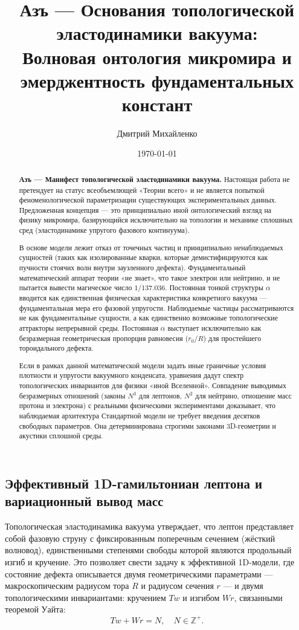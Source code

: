 \documentclass[11pt,a4paper]{article}
\title{\textbf{Азъ — Основания топологической\\ эластодинамики вакуума:\\ Волновая онтология микромира и эмерджентность фундаментальных констант}}
\author{Дмитрий Михайленко}
\date{\today}
\begin{document}
	
	\maketitle
	
	\begin{abstract}
		\textbf{Азъ — Манифест топологической эластодинамики вакуума.} 
		Настоящая работа не претендует на статус всеобъемлющей «Теории всего» и не является попыткой феноменологической параметризации существующих экспериментальных данных. Предложенная концепция — это принципиально иной онтологический взгляд на физику микромира, базирующийся исключительно на топологии и механике сплошных сред (эластодинамике упругого фазового континуума).
		
		В основе модели лежит отказ от точечных частиц и принципиально ненаблюдаемых сущностей (таких как изолированные кварки, которые демистифицируются как пучности стоячих волн внутри заузленного дефекта). Фундаментальный математический аппарат теории «не знает», что такое электрон или нейтрино, и не пытается вывести магическое число $1/137.036$. Постоянная тонкой структуры $\alpha$ вводится как единственная физическая характеристика конкретного вакуума — фундаментальная мера его фазовой упругости. Наблюдаемые частицы рассматриваются не как фундаментальные сущности, а как единственно возможные топологические аттракторы непрерывной среды. Постоянная $\alpha$ выступает исключительно как безразмерная геометрическая пропорция равновесия ($r_0/R$) для простейшего тороидального дефекта. 
		
		Если в рамках данной математической модели задать иные граничные условия плотности и упругости вакуумного конденсата, уравнения дадут спектр топологических инвариантов для физики «иной Вселенной». Совпадение выводимых безразмерных отношений (законы $N^3$ для лептонов, $N^2$ для нейтрино, отношение масс протона и электрона) с реальными физическими экспериментами доказывает, что наблюдаемая архитектура Стандартной модели не требует введения десятков свободных параметров. Она детерминирована строгими законами 3D-геометрии и акустики сплошной среды.
	\end{abstract}
	
\subsection{Эффективный 1D-гамильтониан лептона и вариационный вывод масс}

Топологическая эластодинамика вакуума утверждает, что лептон представляет собой фазовую струну с фиксированным поперечным сечением (жёсткий волновод), единственными степенями свободы которой являются продольный изгиб и кручение. Это позволяет свести задачу к эффективной 1D-модели, где состояние дефекта описывается двумя геометрическими параметрами — макроскопическим радиусом тора $R$ и радиусом сечения $r$ — и двумя топологическими инвариантами: кручением $Tw$ и изгибом $Wr$, связанными теоремой Уайта:
\begin{equation}
    Tw + Wr = N, \quad N \in \mathbb{Z}^+.
\end{equation}
\end{document}
